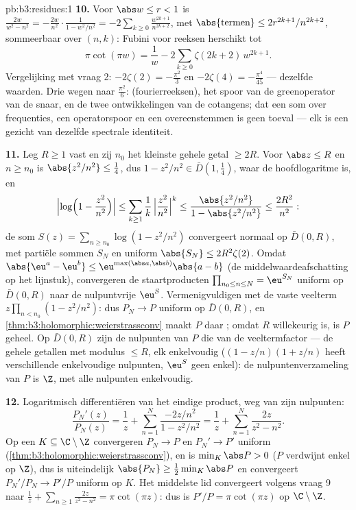 \begin{solution}{pb:b3:residues:1}
\textbf{10.} Voor $\abs w \leq r < 1$ is $\frac{2w}{w^2 - n^2} =
-\frac{2w}{n^2}\cdot\frac1{1 - w^2/n^2} =
-2\sum_{k\geq0}\frac{w^{2k+1}}{n^{2k+2}}$, met
$\abs{\text{termen}} \leq 2r^{2k+1}/n^{2k+2}$, sommeerbaar over
$(n, k)$: Fubini voor reeksen herschikt tot
\[
\pi\cot(\pi w) = \frac1w -
2\sum_{k\geq0}\zeta(2k+2)\,w^{2k+1} .
\]
Vergelijking met vraag 2: $-2\zeta(2) = -\frac{\pi^2}3$ en
$-2\zeta(4) = -\frac{\pi^4}{45}$ --- dezelfde waarden. Drie wegen
naar $\frac{\pi^2}6$:  (fourierreeksen), het spoor van de
greenoperator van de snaar, en de twee ontwikkelingen van de
cotangens; dat een som over frequenties, een operatorspoor en een
 overeenstemmen is geen toeval --- elk is een
gezicht van dezelfde spectrale identiteit.

\textbf{11.} Leg $R \geq 1$ vast en zij $n_0$ het kleinste gehele
getal $\geq 2R$. Voor $\abs z \leq R$ en $n \geq n_0$ is
$\abs{z^2/n^2} \leq \frac14$, dus $1 - z^2/n^2 \in \bar D(1,
\frac14)$, waar de hoofdlogaritme  is, en
\[
\Bigl|\log\Bigl(1 - \frac{z^2}{n^2}\Bigr)\Bigr|
\leq \sum_{k\geq1}\frac1k\,\Bigl|\frac{z^2}{n^2}\Bigr|^k
\leq \frac{\abs{z^2/n^2}}{1 - \abs{z^2/n^2}}
\leq \frac{2R^2}{n^2} :
\]
de som $S(z) = \sum_{n\geq n_0}\log(1 - z^2/n^2)$ convergeert
normaal op $\bar D(0, R)$, met  partiële sommen $S_N$ en
uniform $\abs{S_N} \leq 2R^2\zeta(2)$. Omdat $\abs{\eu^a - \eu^b}
\leq \eu^{\max(\abs a,\abs b)}\abs{a - b}$ (de
middelwaardeafschatting op het lijnstuk), convergeren de
staartproducten $\prod_{n_0\leq n\leq N} = \eu^{S_N}$ uniform op
$\bar D(0, R)$ naar de nulpuntvrije $\eu^S$. Vermenigvuldigen met
de vaste veelterm $z\prod_{n<n_0}(1 - z^2/n^2)$: dus $P_N \to P$
uniform op $\bar D(0, R)$, en
\cref{thm:b3:holomorphic:weierstrassconv} maakt $P$ daar
; omdat $R$ willekeurig is, is $P$ geheel. Op $\bar D(0,
R)$ zijn de nulpunten van $P$ die van de veeltermfactor --- de
gehele getallen met modulus $\leq R$, elk enkelvoudig ($(1 -
z/n)(1 + z/n)$ heeft verschillende enkelvoudige nulpunten,
$\eu^S$ geen enkel): de nulpuntenverzameling van $P$ is $\Z$, met
alle nulpunten enkelvoudig.

\textbf{12.} Logaritmisch differentiëren van het eindige product,
weg van zijn nulpunten:
\[
\frac{P_N'(z)}{P_N(z)} = \frac1z +
\sum_{n=1}^{N}\frac{-2z/n^2}{1 - z^2/n^2}
= \frac1z + \sum_{n=1}^{N}\frac{2z}{z^2 - n^2} .
\]
Op een  $K \subseteq \C\setminus\Z$ convergeren $P_N \to
P$ en $P_N' \to P'$ uniform
(\cref{thm:b3:holomorphic:weierstrassconv}), en is $\min_K\abs P
> 0$ ($P$ verdwijnt enkel op $\Z$), dus is uiteindelijk
$\abs{P_N} \geq \frac12\min_K\abs P$ en convergeert $P_N'/P_N \to
P'/P$ uniform op $K$. Het middelste lid convergeert volgens vraag
9 naar $\frac1z + \sum_{n\geq1}\frac{2z}{z^2-n^2} = \pi\cot(\pi
z)$: dus is $P'/P = \pi\cot(\pi z)$ op $\C\setminus\Z$.


\end{solution}
